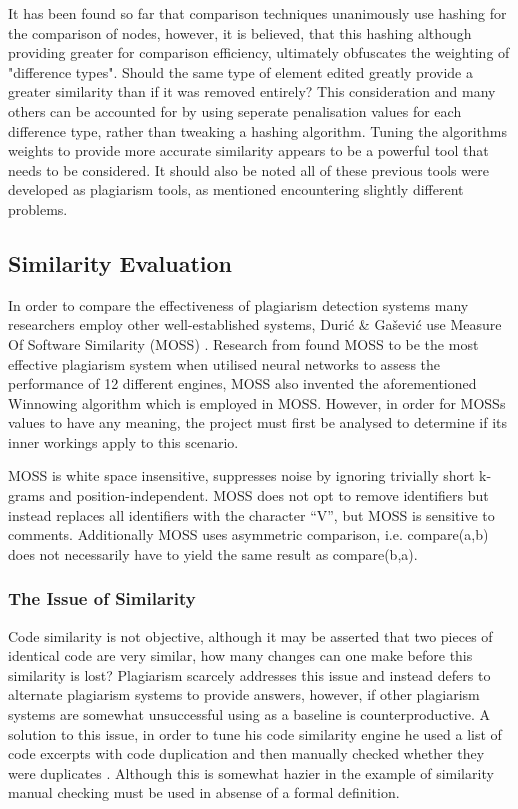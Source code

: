 \documentclass[jou,apacite]{apa6}
\begin{document}
It has been found so far that comparison techniques unanimously use hashing for the comparison of nodes, however, it is believed, that this hashing although providing greater for comparison efficiency, ultimately obfuscates the weighting of "difference types". Should the same type of element edited greatly provide a greater similarity than if it was removed entirely? This consideration and many others can be accounted for by using seperate penalisation values for each difference type, rather than tweaking a hashing algorithm. Tuning the algorithms weights to provide more accurate similarity appears to be a powerful tool that needs to be considered. It should also be noted all of these previous tools were developed as plagiarism tools, as mentioned encountering slightly different problems. 
\subsection{Similarity Evaluation}

In order to compare the effectiveness of plagiarism detection systems many researchers employ other well-established systems, Duri\'{c} \& Ga\v{s}evi\'{c} use Measure Of Software Similarity (MOSS) \cite{aiken1994}. Research from \cite{Engels2007} found MOSS to be the most effective plagiarism system when utilised neural networks to assess the performance of 12 different engines, MOSS also invented the aforementioned Winnowing algorithm \cite{Schleimer2003} which is employed in MOSS. However, in order for MOSS\textquotesingle s values to have any meaning, the project must first be analysed to determine if it\textquotesingle s inner workings apply to this scenario.

MOSS is white space insensitive, suppresses noise by ignoring trivially short k-grams and position-independent. MOSS does not opt to remove identifiers but instead replaces all identifiers with the character \textquotedblleft{}V\textquotedblright{}, but MOSS is sensitive to comments. Additionally MOSS uses asymmetric comparison, i.e. compare(a,b) does not necessarily have to yield the same result as compare(b,a). 

\subsubsection{The Issue of Similarity}
Code similarity is not objective, although it may be asserted that two pieces of identical code are very similar, how many changes can one make before this similarity is lost? Plagiarism scarcely addresses this issue and instead defers to alternate plagiarism systems to provide answers, however, if other plagiarism systems are somewhat unsuccessful using as  a baseline is counterproductive. A solution to this issue, in order to tune his code similarity engine he used a list of code excerpts with code duplication and then manually checked whether they were duplicates \cite{Krinke2002}. Although this is somewhat hazier in the example of similarity manual checking must be used in absense of a formal definition.
\end{document}
